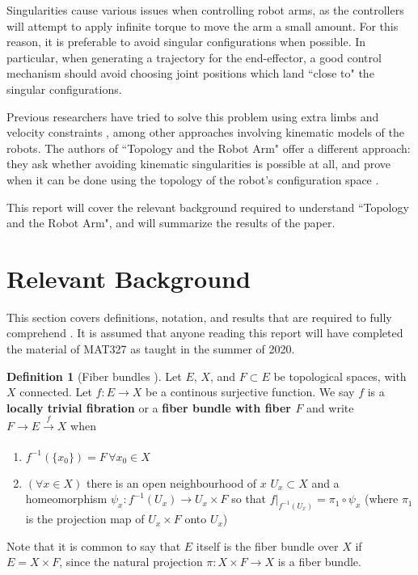 \documentclass[12pt]{article}
\theoremstyle{definition}
\newtheorem{defn}{Definition}
\begin{document}
Singularities cause various issues when controlling robot arms, as the
controllers will attempt to apply infinite torque to move the arm a 
small amount. For this reason, it is preferable
to avoid singular configurations when possible. In particular, when generating a
trajectory for the end-effector, a good control mechanism should avoid choosing
joint positions which land ``close to" the singular configurations.

Previous researchers have tried to solve this problem using extra limbs
\cite{program-kin-red-manips} and velocity constraints
\cite{articulated-robot-redundancy}, among other approaches involving kinematic
models of the robots. The authors of
``Topology and the Robot Arm" offer a different approach: they ask whether
avoiding kinematic singularities is possible at all, and prove when it can be
done using the topology of the robot's configuration space
\cite{topology-robot-arm}.

This report will cover the relevant background required to understand 
``Topology and the Robot Arm",
and will summarize the results of the paper.

\section{Relevant Background}
This section covers definitions, notation, and results that are required to
fully comprehend \cite{topology-robot-arm}. It is assumed that anyone reading
this report will have completed the material of MAT327 as taught in the summer
of 2020.

\begin{defn}[Fiber bundles \cite{topology-fiber-bundles}]
    Let \(E\), \(X\), and \(F \subset E\) be topological spaces, 
    with \(X\) connected.
    Let \(f : E \rightarrow X\) be a continous surjective function. 
    We say \(f\) is a \textbf{locally trivial fibration} or a 
    \textbf{fiber bundle with fiber \(F\)} and write 
    \(F \rightarrow E \xrightarrow[]{f} X\) when
    \begin{enumerate}
        \item \(f^{-1}(\{x_0\}) = F \, \forall x_0 \in X\)
        \item \((\forall x \in X)\) there is an open neighbourhood of \(x\)
            \(U_x \subset X\) and a homeomorphism
            \(\psi_x : f^{-1}(U_x) \rightarrow U_x \times F\) so that
            \(f\vert_{f^{-1}(U_x)} = \pi_1 \circ \psi_x\) (where \(\pi_1\)
            is the projection map of \(U_x \times F\) onto \(U_x\))
    \end{enumerate}
    Note that it is common to say that \(E\) itself is the fiber bundle over
    \(X\) if \(E = X \times F\), since the natural projection 
    \(\pi : X \times F \rightarrow X\) is a fiber bundle.
\end{defn}
\end{document}
